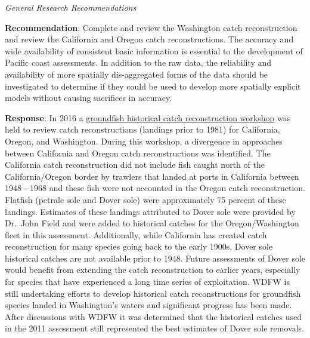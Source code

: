 \documentclass[11pt,
  english,
  a4paper,
]{article}
\begin{document}
\leavevmode\tagmcend\tagstructend


\emph{General Research Recommendations}

\leavevmode\tagmcend\tagstructend\par


\textbf{Recommendation}: Complete and review the Washington catch reconstruction and review the California and Oregon catch reconstructions. The accuracy and wide availability of consistent basic information is essential to the development of Pacific coast assessments. In addition to the raw data, the reliability and availability of more spatially dis-aggregated forms of the data should be investigated to determine if they could be used to develop more spatially explicit models without causing sacrifices in accuracy.

\leavevmode\tagmcend\tagstructend\par


\textbf{Response}: In 2016 a {\href{https://www.pcouncil.org/documents/2017/03/i2_att1_catch_reconstruction_workshop_report_mar2017bb.pdf/}{groundfish historical catch reconstruction workshop}\leavevmode\tagmcend\tagstructend} was held to review catch reconstructions (landings prior to 1981) for California, Oregon, and Washington. During this workshop, a divergence in approaches between California and Oregon catch reconstructions was identified. The California catch reconstruction did not include fish caught north of the California/Oregon border by trawlers that landed at ports in California between 1948 - 1968 and these fish were not accounted in the Oregon catch reconstruction. Flatfish (petrale sole and Dover sole) were approximately 75 percent of these landings. Estimates of these landings attributed to Dover sole were provided by Dr.~John Field and were added to historical catches for the Oregon/Washington fleet in this assessment. Additionally, while California has created catch reconstruction for many species going back to the early 1900s, Dover sole historical catches are not available prior to 1948. Future assessments of Dover sole would benefit from extending the catch reconstruction to earlier years, especially for species that have experienced a long time series of exploitation. WDFW is still undertaking efforts to develop historical catch reconstructions for groundfish species landed in Washington's waters and significant progress has been made. After discussions with WDFW it was determined that the historical catches used in the 2011 assessment still represented the best estimates of Dover sole removals.
\end{document}
